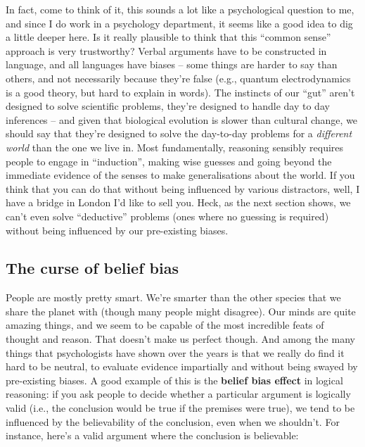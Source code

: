 \documentclass[
  a4paper,
]{book}
\begin{document}
In fact, come to think of it, this sounds a lot like a psychological
question to me, and since I do work in a psychology department, it seems
like a good idea to dig a little deeper here. Is it really plausible to
think that this ``common sense'' approach is very trustworthy? Verbal
arguments have to be constructed in language, and all languages have
biases -- some things are harder to say than others, and not necessarily
because they're false (e.g., quantum electrodynamics is a good theory,
but hard to explain in words). The instincts of our ``gut'' aren't
designed to solve scientific problems, they're designed to handle day to
day inferences -- and given that biological evolution is slower than
cultural change, we should say that they're designed to solve the
day-to-day problems for a \emph{different world} than the one we live
in. Most fundamentally, reasoning sensibly requires people to engage in
``induction'', making wise guesses and going beyond the immediate
evidence of the senses to make generalisations about the world. If you
think that you can do that without being influenced by various
distractors, well, I have a bridge in London I'd like to sell you. Heck,
as the next section shows, we can't even solve ``deductive'' problems
(ones where no guessing is required) without being influenced by our
pre-existing biases.

\hypertarget{the-curse-of-belief-bias}{%
\subsection{The curse of belief bias}\label{the-curse-of-belief-bias}}

People are mostly pretty smart. We're smarter than the other species
that we share the planet with (though many people might disagree). Our
minds are quite amazing things, and we seem to be capable of the most
incredible feats of thought and reason. That doesn't make us perfect
though. And among the many things that psychologists have shown over the
years is that we really do find it hard to be neutral, to evaluate
evidence impartially and without being swayed by pre-existing biases. A
good example of this is the \textbf{belief bias effect} in logical
reasoning: if you ask people to decide whether a particular argument is
logically valid (i.e., the conclusion would be true if the premises were
true), we tend to be influenced by the believability of the conclusion,
even when we shouldn't. For instance, here's a valid argument where the
conclusion is believable:
\end{document}
